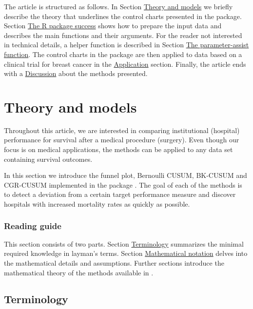 The article is structured as follows. In Section \protect\hyperlink{sec:TheoryandModels}{Theory and models} we briefly describe the theory that underlines the control charts presented in the package. Section \protect\hyperlink{sec:Rpkgsuccess}{The R package success} shows how to prepare the input data and describes the main functions and their arguments. For the reader not interested in technical details, a helper function is described in Section \protect\hyperlink{sec:parassistfct}{The parameter-assist function}. The control charts in the package are then applied to data based on a clinical trial for breast cancer in the \protect\hyperlink{sec:application}{Application} section. Finally, the article ends with a \protect\hyperlink{discussion}{Discussion} about the methods presented.

\hypertarget{sec:TheoryandModels}{%
\section{Theory and models}\label{sec:TheoryandModels}}

Throughout this article, we are interested in comparing institutional (hospital) performance for survival after a medical procedure (surgery). Even though our focus is on medical applications, the methods can be applied to any data set containing survival outcomes.

In this section we introduce the funnel plot, Bernoulli CUSUM, BK-CUSUM and CGR-CUSUM implemented in the package . The goal of each of the methods is to detect a deviation from a certain target performance measure and discover hospitals with increased mortality rates as quickly as possible.

\hypertarget{sec:ReadingGuide}{%
\subsubsection{Reading guide}\label{sec:ReadingGuide}}

This section consists of two parts. Section \protect\hyperlink{sec:Terminology}{Terminology} summarizes the minimal required knowledge in layman's terms. Section \protect\hyperlink{sec:MathematicalNotation}{Mathematical notation} delves into the mathematical details and assumptions. Further sections introduce the mathematical theory of the methods available in .

\hypertarget{sec:Terminology}{%
\subsection{Terminology}\label{sec:Terminology}}

